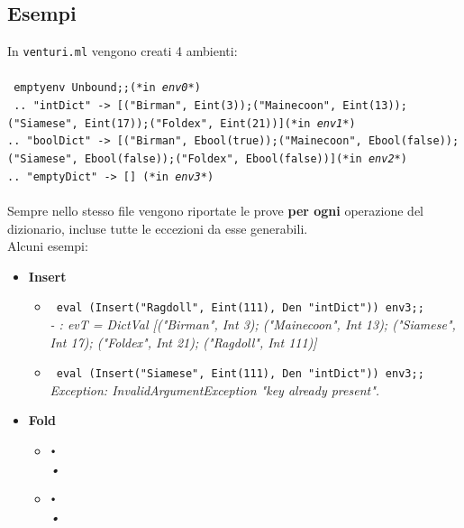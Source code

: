 \documentclass[10pt, a4paper]{article}
\begin{document}
\subsection{Esempi}
In \texttt{venturi.ml} vengono creati 4 ambienti:\\ \\
\texttt{
emptyenv Unbound;;(*in \emph{env0}*)\\{
.. "intDict" -> [("Birman", Eint(3));("Mainecoon", Eint(13));("Siamese", Eint(17));("Foldex", Eint(21))](*in \emph{env1}*)\\
.. "boolDict" -> [("Birman", Ebool(true));("Mainecoon", Ebool(false));("Siamese", Ebool(false));("Foldex", Ebool(false))](*in \emph{env2}*)\\
.. "emptyDict" -> [] (*in \emph{env3}*)}
}\\ \\
Sempre nello stesso file vengono riportate le prove \textbf{per ogni} operazione del dizionario, incluse tutte le eccezioni da esse generabili.\\
Alcuni esempi: 
\begin{itemize}
\item \textbf{Insert} 
\begin{itemize}
\item \texttt{
eval (Insert("Ragdoll", Eint(111), Den "intDict")) env3;;}\\\textit{- : evT =
DictVal
 [("Birman", Int 3); ("Mainecoon", Int 13); ("Siamese", Int 17);
  ("Foldex", Int 21); ("Ragdoll", Int 111)]}
\item \texttt{
		eval (Insert("Siamese", Eint(111), Den "intDict")) env3;;}\\\textit{Exception: InvalidArgumentException "key already present".
}
\end{itemize}
\item \textbf{Fold}
\begin{itemize}
\item \texttt{•} \\ \textit{•}

\item \texttt{•}\\ \textit{•}
\end{itemize}
\end{itemize}
\end{document}
